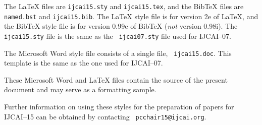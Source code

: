 \documentclass{article}
\begin{document}
The \LaTeX{} files are {\tt ijcai15.sty} and {\tt ijcai15.tex}, and
the Bib\TeX{} files are {\tt named.bst} and {\tt ijcai15.bib}. The
\LaTeX{} style file is for version 2e of \LaTeX{}, and the Bib\TeX{}
style file is for version 0.99c of Bib\TeX{} ({\em not} version
0.98i). The {\tt ijcai15.sty} file is the same as the {\tt
ijcai07.sty} file used for IJCAI--07.

The Microsoft Word style file consists of a single file, {\tt
ijcai15.doc}. This template is the same as the one used for
IJCAI--07.

These Microsoft Word and \LaTeX{} files contain the source of the
present document and may serve as a formatting sample.  

Further information on using these styles for the preparation of
papers for IJCAI--15 can be obtained by contacting {\tt
pcchair15@ijcai.org}.



\end{document}
